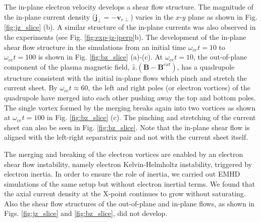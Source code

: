 \documentclass[aip,preprint]{revtex4-1}
\begin{document}
The in-plane electron velocity  develops a shear flow structure. 
The magnitude of the in-plane current density ($\mathbf{j}_{\perp}=-\mathbf{v}_{e\perp}$) varies in the $x$-$y$ plane as shown in Fig. \ref{fig:jz_slice} (b). A similar structure of the in-plane currents was also observed in the experiments (see Fig. \ref{fig:exp-jz-jperp}b).
The development of the in-plane shear flow structure in the simulations from an initial time $\omega_{ce}t=10$ to $\omega_{ce}t=100$ is shown in Fig. \ref{fig:bz_slice} (a)-(c). At $\omega_{ce}t=10$, the out-of-plane component of the plasma magnetic field, $\hat{z}.(\mathbf{B}-\mathbf{B}^{ext})$, has a quadrupole structure consistent with the initial in-plane flows which pinch and stretch the current sheet. By $\omega_{ce}t \approx 60$, the left and right poles (or electron vortices) of the quadrupole have merged into each other pushing away the top and bottom poles.  The single vortex formed by the merging 
breaks again into two vortices as shown at $\omega_{ce}t=100$ in Fig. \ref{fig:bz_slice} (c). The pinching and stretching of the current sheet can also be seen in Fig. \ref{fig:bz_slice}. Note that the in-plane shear flow is aligned with the left-right separatrix pair and not with the current sheet itself. 

The merging and breaking of the electron vortices  are enabled by an electron shear flow instability, namely electron Kelvin-Helmholtz instability, triggered by electron inertia. In order to ensure the role of inertia, we carried out EMHD simulations of the same setup but without electron inertial terms. We found that the axial current density at the X-point continues to grow without saturating. Also the shear flow structures of the out-of-plane and in-plane flows, as shown in Figs. \ref{fig:jz_slice} and \ref{fig:bz_slice}, did not develop.




\end{document}
